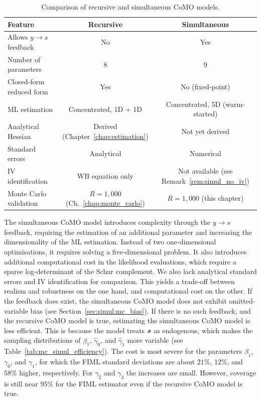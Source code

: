 \begin{table}[htbp]
\centering
\caption[Comparison of recursive and simultaneous CoMO models]{Comparison of recursive and simultaneous CoMO models.}
\label{tab:recursive_vs_simul}
\small
\begin{tabular}{lcc}
\toprule
Feature & Recursive & Simultaneous \\
\midrule
Allows $y \to s$ feedback & No & Yes \\
Number of parameters & 8 & 9 \\
Closed-form reduced form & Yes & No (fixed-point) \\
ML estimation & Concentrated, 1D + 1D & Concentrated, 5D (warm-started) \\
Analytical Hessian & Derived (Chapter~\ref{chap:estimation}) & Not yet derived \\
Standard errors & Analytical & Numerical \\
IV identification & WB equation only & Not available (see Remark~\ref{rem:simul_no_iv}) \\
Monte Carlo validation & $R = 1{,}000$ (Ch.~\ref{chap:monte_carlo}) & $R = 1{,}000$ (this chapter) \\
\bottomrule
\end{tabular}
\end{table}

The simultaneous CoMO model introduces complexity through the $y \to s$ feedback, requiring the estimation of an additional parameter and increasing the dimensionality of the ML estimation. Instead of two one-dimensional optimisations, it requires solving a five-dimensional problem. It also introduces additional computational cost in the likelihood evaluations, which require a sparse log-determinant of the Schur complement. We also lack analytical standard errors and IV identification for comparison. This yields a trade-off between realism and robustness on the one hand, and computational cost on the other. If the feedback does exist, the simultaneous CoMO model does not exhibit omitted-variable bias (see Section~\ref{sec:simul:mc_bias}). If there is no such feedback, and the recursive CoMO model is true, estimating the simultaneous CoMO model is less efficient. This is because the model treats $\bm{s}$ as endogenous, which makes the sampling distributions of $\hat{\beta}_1$, $\hat{\gamma}_0$, and $\hat{\gamma}_1$ more variable (see Table~\ref{tab:mc_simul_efficiency}). The cost is most severe for the parameters $\beta_1$, $\gamma_0$, and $\gamma_1$, for which the FIML standard deviations are about $21\%$, $12\%$, and $58\%$ higher, respectively. For $\gamma_2$ and $\gamma_3$ the increases are small. However, coverage is still near $95\%$ for the FIML estimator even if the recursive CoMO model is true.

